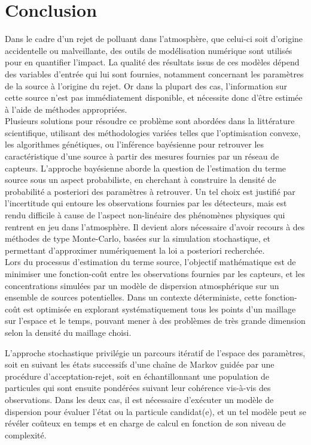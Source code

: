 \chapter{Conclusion}

Dans le cadre d'un rejet de polluant dans l'atmosphère, que celui-ci soit d'origine accidentelle ou malveillante, des outils de modélisation numérique sont utilisés pour en quantifier l'impact. La qualité des résultats issus de ces modèles dépend des variables d'entrée qui lui sont fournies, notamment concernant les paramètres de la source à l'origine du rejet. Or dans la plupart des cas, l'information sur cette source n'est pas immédiatement disponible, et nécessite donc d'être estimée à l'aide de méthodes appropriées. \\

Plusieurs solutions pour résoudre ce problème sont abordées dans la littérature scientifique, utilisant des méthodologies variées telles que l'optimisation convexe, les algorithmes génétiques, ou l'inférence bayésienne pour retrouver les caractéristique d'une source à partir des mesures fournies par un réseau de capteurs. L'approche bayésienne aborde la question de l'estimation du terme source sous un aspect probabiliste, en cherchant à construire la densité de probabilité a posteriori des paramètres à retrouver. Un tel choix est justifié par l'incertitude qui entoure les observations fournies par les détecteurs, mais est rendu difficile à cause de l'aspect non-linéaire des phénomènes physiques qui rentrent en jeu dans l'atmosphère. Il devient alors nécessaire d'avoir recours à des méthodes de type Monte-Carlo, basées sur la simulation stochastique, et permettant d'approximer numériquement la loi a posteriori recherchée. \\

Lors du processus d'estimation du terme source, l'objectif mathématique est de minimiser une fonction-coût entre les observations fournies par les capteurs, et les concentrations simulées par un modèle de dispersion atmosphérique sur un ensemble de sources potentielles. Dans un contexte déterministe, cette fonction-coût est optimisée en explorant systématiquement tous les points d'un maillage sur l'espace et le temps, pouvant mener à des problèmes de très grande dimension selon la densité du maillage choisi. 

L'approche stochastique privilégie un parcours itératif de l'espace des paramètres, soit en suivant les états successifs d'une chaîne de Markov guidée par une procédure d'acceptation-rejet, soit en échantillonnant une population de particules qui sont ensuite pondérées suivant leur cohérence vis-à-vis des observations. Dans les deux cas, il est nécessaire d'exécuter un modèle de dispersion pour évaluer l'état ou la particule candidat(e), et un tel modèle peut se révéler coûteux en temps et en charge de calcul en fonction de son niveau de complexité. \\

